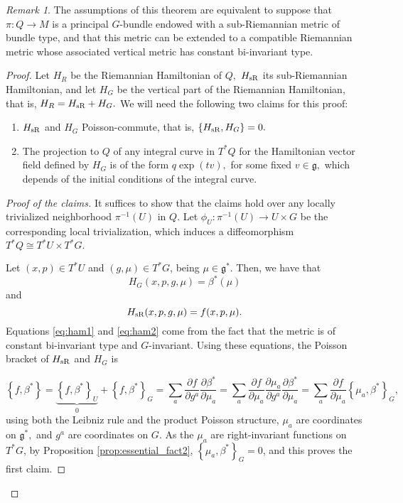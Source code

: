 \documentclass[12pt, letterpaper, reqno]{amsart}
\theoremstyle{definition}
\theoremstyle{plain}
\theoremstyle{remark}
\newtheorem{rem}{Remark}
\begin{document}
\begin{rem}
The assumptions of this theorem are equivalent to suppose that $ \pi: Q \rightarrow  M $ is a principal $ G $-bundle endowed with a sub-Riemannian metric of bundle type, and that this metric can be extended to a compatible Riemannian metric whose associated vertical metric has constant bi-invariant type.	
\end{rem}
\begin{proof}
	Let $ H_R $ be the Riemannian Hamiltonian of $ Q, $ $ H_{\rm sR} $ its sub-Riemannian Hamiltonian, and let $ H_G$ be the vertical part of the Riemannian Hamiltonian, that is, $ H_R = H_{\rm sR}+H_G. $  We will need the following two claims for this proof:
	\begin{enumerate}
		\item $ H_{\rm sR} $ and $ H_G $ Poisson-commute, that is, $ \left\{ H_{\rm sR}, H_G \right\} =0. $ 
		\item The projection to $ Q $ of any integral curve in $ T^*Q $ for the Hamiltonian vector field defined by $ H_G $ is of the form $ q \operatorname{exp}(tv),  $ for some fixed $ v\in \mathfrak{g}, $ which depends of the initial conditions of the integral curve.
	\end{enumerate}
	\begin{proof}
		[Proof of the claims] It suffices to show that the claims hold over any locally trivialized neighborhood $ \pi^{-1}(U) $ in $ Q. $ Let $ \phi_U: \pi^{-1}(U) \rightarrow U\times G $ be the corresponding local trivialization, which induces a diffeomorphism $ T^*Q \cong T^*U\times T^*G.$

		Let $ (x,p)\in T^* U $ and $ (g,\mu)\in T^*G $, being $ \mu\in \mathfrak{g}^*. $ Then, we have that
		\begin{equation}\label{eq:ham1}
			H_G(x,p,g,\mu) = \beta^*(\mu)
		\end{equation}
		and
		\begin{equation}\label{eq:ham2}
			H_{\rm sR}(x,p,g,\mu)= f(x,p,\mu).	
		\end{equation}
		Equations \eqref{eq:ham1} and \eqref{eq:ham2} come from the fact that the metric is of constant bi-invariant type and $ G $-invariant. Using these equations, the Poisson bracket of $ H_{\rm sR} $ and $ H_{G} $ is

		$$ \left\{ f,\beta^* \right\} = \underbrace{\left\{ f,\beta^* \right\}_U}_0 + \left\{ f,\beta^* \right\}_G = \sum^{}_{a} \frac{\partial f}{\partial g^a} \frac{\partial \beta^*}{\partial \mu_a} = \sum^{}_{a} \frac{\partial f}{\partial \mu_a} \frac{\partial \mu_a}{\partial g^a} \frac{\partial \beta^*}{\partial \mu_a}  = \sum^{}_{a} \frac{\partial f}{\partial \mu_a} \left\{ \mu_a, \beta^* \right\}_G, $$ 
		using both the Leibniz rule and the product Poisson structure, $ \mu_a $ are coordinates on $ \mathfrak{g}^*, $ and $ g^a $ are coordinates on $ G. $ As the $ \mu_a $ are right-invariant functions on $ T^*G$, by Proposition \ref{prop:essential_fact2}, $ \left\{ \mu_a,\beta^* \right\}_G =0 $, and this proves the first claim.


\end{proof}
\end{proof}
\end{document}
